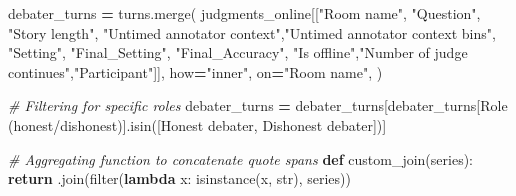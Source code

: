 \documentclass[
]{article}
\newenvironment{Shaded}{\begin{snugshade}}{\end{snugshade}}
\newcommand{\BuiltInTok}[1]{#1}
\newcommand{\CommentTok}[1]{\textcolor[rgb]{0.56,0.35,0.01}{\textit{#1}}}
\newcommand{\ControlFlowTok}[1]{\textcolor[rgb]{0.13,0.29,0.53}{\textbf{#1}}}
\newcommand{\KeywordTok}[1]{\textcolor[rgb]{0.13,0.29,0.53}{\textbf{#1}}}
\newcommand{\NormalTok}[1]{#1}
\newcommand{\OperatorTok}[1]{\textcolor[rgb]{0.81,0.36,0.00}{\textbf{#1}}}
\newcommand{\StringTok}[1]{\textcolor[rgb]{0.31,0.60,0.02}{#1}}
\begin{document}
\begin{Shaded}
\begin{Highlighting}[]
\NormalTok{debater\_turns }\OperatorTok{=}\NormalTok{ turns.merge(}
\NormalTok{        judgments\_online[[}\StringTok{"Room name"}\NormalTok{, }\StringTok{"Question"}\NormalTok{, }\StringTok{"Story length"}\NormalTok{,}
                 \StringTok{"Untimed annotator context"}\NormalTok{,}\StringTok{"Untimed annotator context bins"}\NormalTok{,}
                 \StringTok{"Setting"}\NormalTok{, }\StringTok{"Final\_Setting"}\NormalTok{, }\StringTok{"Final\_Accuracy"}\NormalTok{,}
                 \StringTok{"Is offline"}\NormalTok{,}\StringTok{"Number of judge continues"}\NormalTok{,}\StringTok{"Participant"}\NormalTok{]],}
\NormalTok{        how}\OperatorTok{=}\StringTok{"inner"}\NormalTok{,}
\NormalTok{        on}\OperatorTok{=}\StringTok{"Room name"}\NormalTok{,}
\NormalTok{    )}



\CommentTok{\# Filtering for specific roles}
\NormalTok{debater\_turns }\OperatorTok{=}\NormalTok{ debater\_turns[debater\_turns[}\StringTok{\textquotesingle{}Role (honest/dishonest)\textquotesingle{}}\NormalTok{].isin([}\StringTok{\textquotesingle{}Honest debater\textquotesingle{}}\NormalTok{, }\StringTok{\textquotesingle{}Dishonest debater\textquotesingle{}}\NormalTok{])]}

\CommentTok{\# Aggregating function to concatenate quote spans}
\KeywordTok{def}\NormalTok{ custom\_join(series):}
    \ControlFlowTok{return} \StringTok{\textquotesingle{} \textquotesingle{}}\NormalTok{.join(}\BuiltInTok{filter}\NormalTok{(}\KeywordTok{lambda}\NormalTok{ x: }\BuiltInTok{isinstance}\NormalTok{(x, }\BuiltInTok{str}\NormalTok{), series))}



\end{Highlighting}
\end{Shaded}
\end{document}
